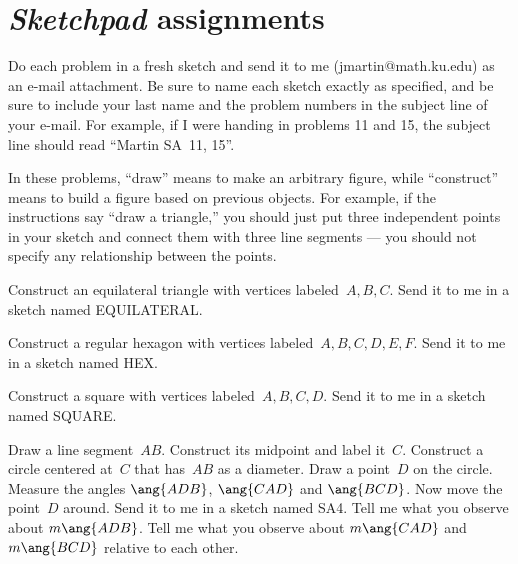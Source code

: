 

\section{\textit{Sketchpad} assignments}

Do each problem in a fresh sketch and send it to me (jmartin@math.ku.edu) as an 
e-mail attachment.  Be sure to name each sketch exactly as specified, and be sure 
to include your last name and the problem numbers in the subject line of your 
e-mail.  For example, if I were handing in problems 11 and 15, the subject line 
should read ``Martin SA~11, 15''.

In these problems, ``draw'' means to make an arbitrary figure,
while ``construct'' means to build a figure based on previous objects.
For example, if the instructions say ``draw a triangle,'' you should
just put three independent points in your sketch and connect them
with three line segments --- you should not specify any relationship
between the points.

\begin{SA}
Construct an equilateral triangle with vertices labeled~$A,B,C$.  Send it 
to me in a sketch named EQUILATERAL.
\end{SA}

\begin{SA}
Construct a regular hexagon with vertices labeled~$A,B,C,D,E,F$.  Send it 
to me in a sketch named HEX.
\end{SA}

\begin{SA}
Construct a square with vertices labeled~$A,B,C,D$.  Send it to me in a 
sketch named SQUARE.
\end{SA}

\begin{SA}\label{double-angle}
Draw a line segment~$AB$.  Construct its midpoint and label it~$C$.
Construct a circle centered at~$C$ that has~$AB$ as a 
diameter.  Draw a point~$D$ on the circle.
Measure the angles $\ang{ADB}$, $\ang{CAD}$ and $\ang{BCD}$.  Now move the point~$D$ around.  Send it to me in a sketch named SA4.
Tell me what you observe about $m\ang{ADB}$.
Tell me what you observe about $m\ang{CAD}$ and $m\ang{BCD}$
relative to each other.
\end{SA}

